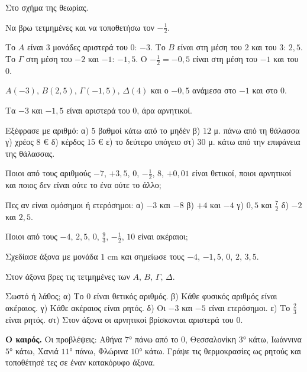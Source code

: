 \tixero Στο σχήμα της θεωρίας.\par
\tithelo Να βρω τετμημένες και να τοποθετήσω τον $-\frac{1}{2}$.\par
\possindeo Το $A$ είναι $3$ μονάδες αριστερά του $0$: $-3$. Το $B$ είναι στη μέση του $2$ και του $3$: $2{,}5$. Το $\Gamma$ στη μέση του $-2$ και $-1$: $-1{,}5$. Ο $-\frac{1}{2}=-0{,}5$ είναι στη μέση του $-1$ και του $0$.\par
\apantisi $A(-3)$, $B(2{,}5)$, $\Gamma(-1{,}5)$, $\Delta(4)$ και ο $-0{,}5$ ανάμεσα στο $-1$ και στο $0$.\par
\elegxos Τα $-3$ και $-1{,}5$ είναι αριστερά του $0$, άρα αρνητικοί.



\ex Εξέφρασε με αριθμό: α) $5$ βαθμοί κάτω από το μηδέν \quad β) $12$ μ. πάνω από τη θάλασσα \quad γ) χρέος $8$ € \quad δ) κέρδος $15$ € \quad ε) το δεύτερο υπόγειο \quad στ) $30$ μ. κάτω από την επιφάνεια της θάλασσας.

\ex Ποιοι από τους αριθμούς $-7$, $+3{,}5$, $0$, $-\frac{1}{2}$, $8$, $+0{,}01$ είναι θετικοί, ποιοι αρνητικοί και ποιος δεν είναι ούτε το ένα ούτε το άλλο;

\ex Πες αν είναι ομόσημοι ή ετερόσημοι: α) $-3$ και $-8$ \quad β) $+4$ και $-4$ \quad γ) $0{,}5$ και $\frac{7}{2}$ \quad δ) $-2$ και $2{,}5$.

\ex Ποιοι από τους $-4$, $2{,}5$, $0$, $\frac{9}{3}$, $-\frac{1}{2}$, $10$ είναι ακέραιοι;

\ex Σχεδίασε άξονα με μονάδα $1$ cm και σημείωσε τους $-4$, $-1{,}5$, $0$, $2$, $3{,}5$.

\ex Στον άξονα βρες τις τετμημένες των $A,\,B,\,\Gamma,\,\Delta$.
\begin{center}
\end{center}

\ex Σωστό ή λάθος; α) Το $0$ είναι θετικός αριθμός. \quad β) Κάθε φυσικός αριθμός είναι ακέραιος. \quad γ) Κάθε ακέραιος είναι ρητός. \quad δ) Οι $-3$ και $-5$ είναι ετερόσημοι. \quad ε) Το $\frac{2}{3}$ είναι ρητός. \quad στ) Στον άξονα οι αρνητικοί βρίσκονται αριστερά του $0$.


\ex \textbf{Ο καιρός.} Οι προβλέψεις: Αθήνα $7$° πάνω από το $0$, Θεσσαλονίκη $3$° κάτω, Ιωάννινα $5$° κάτω, Χανιά $11$° πάνω, Φλώρινα $10$° κάτω. Γράψε τις θερμοκρασίες ως ρητούς και τοποθέτησέ τες σε έναν κατακόρυφο άξονα.

